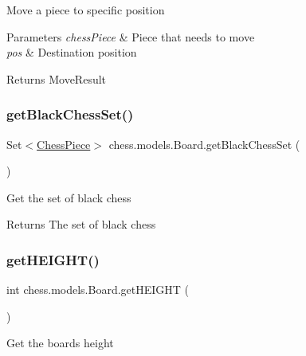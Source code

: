 Move a piece to specific position


\begin{DoxyParams}{Parameters}
{\em chess\+Piece} & Piece that needs to move \\
\hline
{\em pos} & Destination position \\
\hline
\end{DoxyParams}
\begin{DoxyReturn}{Returns}
Move\+Result 
\end{DoxyReturn}
\mbox{\label{classchess_1_1models_1_1_board_a4dcc35426fd6ebe9725b2edaa4752310}} 
\subsubsection{\texorpdfstring{get\+Black\+Chess\+Set()}{getBlackChessSet()}}
{\footnotesize\ttfamily Set$<$\mbox{\hyperlink{classchess_1_1models_1_1_chess_piece}{Chess\+Piece}}$>$ chess.\+models.\+Board.\+get\+Black\+Chess\+Set (\begin{DoxyParamCaption}{ }\end{DoxyParamCaption})}

Get the set of black chess

\begin{DoxyReturn}{Returns}
The set of black chess 
\end{DoxyReturn}
\mbox{\label{classchess_1_1models_1_1_board_a28a3d4b9d0738a26666b7c97394242a9}} 
\subsubsection{\texorpdfstring{get\+H\+E\+I\+G\+H\+T()}{getHEIGHT()}}
{\footnotesize\ttfamily int chess.\+models.\+Board.\+get\+H\+E\+I\+G\+HT (\begin{DoxyParamCaption}{ }\end{DoxyParamCaption})}

Get the board\textquotesingle{}s height

